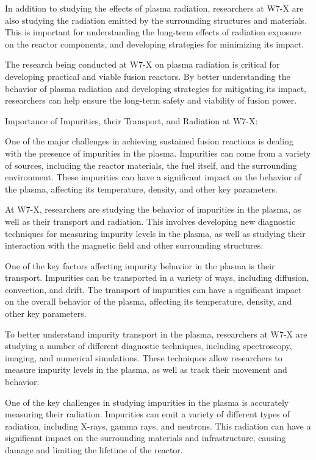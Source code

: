 \documentclass[12pt]{article}
\begin{document}
In addition to studying the effects of plasma radiation, researchers at W7-X are also studying the radiation emitted by the surrounding structures and materials. This is important for understanding the long-term effects of radiation exposure on the reactor components, and developing strategies for minimizing its impact.

The research being conducted at W7-X on plasma radiation is critical for developing practical and viable fusion reactors. By better understanding the behavior of plasma radiation and developing strategies for mitigating its impact, researchers can help ensure the long-term safety and viability of fusion power.

Importance of Impurities, their Transport, and Radiation at W7-X:

One of the major challenges in achieving sustained fusion reactions is dealing with the presence of impurities in the plasma. Impurities can come from a variety of sources, including the reactor materials, the fuel itself, and the surrounding environment. These impurities can have a significant impact on the behavior of the plasma, affecting its temperature, density, and other key parameters.

At W7-X, researchers are studying the behavior of impurities in the plasma, as well as their transport and radiation. This involves developing new diagnostic techniques for measuring impurity levels in the plasma, as well as studying their interaction with the magnetic field and other surrounding structures.

One of the key factors affecting impurity behavior in the plasma is their transport. Impurities can be transported in a variety of ways, including diffusion, convection, and drift. The transport of impurities can have a significant impact on the overall behavior of the plasma, affecting its temperature, density, and other key parameters.

To better understand impurity transport in the plasma, researchers at W7-X are studying a number of different diagnostic techniques, including spectroscopy, imaging, and numerical simulations. These techniques allow researchers to measure impurity levels in the plasma, as well as track their movement and behavior.

One of the key challenges in studying impurities in the plasma is accurately measuring their radiation. Impurities can emit a variety of different types of radiation, including X-rays, gamma rays, and neutrons. This radiation can have a significant impact on the surrounding materials and infrastructure, causing damage and limiting the lifetime of the reactor.
\end{document}
